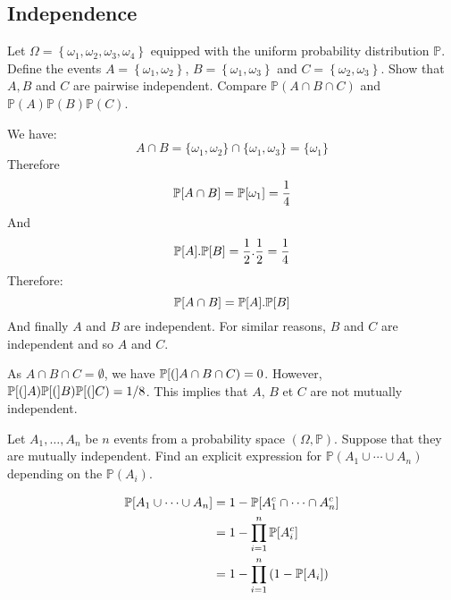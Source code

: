 \begin{center}
  \section*{Independence}
\end{center}

\begin{Exercise}[origin=Independent events]
  Let $\Omega=\left\{\omega_{1}, \omega_{2}, \omega_{3}, \omega_{4}\right\}$ equipped with the uniform probability distribution $\mathbb{P}$. Define the events $A=\left\{\omega_{1}, \omega_{2}\right\}$, $B=\left\{\omega_{1}, \omega_{3}\right\}$ and $C=\left\{\omega_{2}, \omega_{3}\right\}$.
  Show that $A, B$ and $C$ are pairwise independent. Compare $\mathbb{P}(A \cap B \cap C)$ and $\mathbb{P}(A) \mathbb{P}(B) \mathbb{P}(C)$.
\end{Exercise}

\vspace{0.5cm}

\begin{solution}
  We have:
  \[
    A \cap B = \{\omega_1, \omega_2\} \cap \{\omega_1, \omega_3\} =  \{\omega_1\}
  \]
  Therefore
  \[
    \mathbb{P}[A \cap B] = \mathbb{P}[\omega_1] = \frac{1}{4}
  \]
  And
  \[
    \mathbb{P}[A]. \mathbb{P}[B] = \frac{1}{2} . \frac{1}{2} = \frac{1}{4}
  \]
  Therefore:
  \[
    \mathbb{P}[A \cap B] = \mathbb{P}[A].\mathbb{P}[B]
  \]
  And finally $A$ and $B$ are independent. For similar reasons, $B$ and $C$ are independent and so $A$ and $C$.

  As $A \cap B \cap C=\emptyset$, we have  $\mathbb{P}[(]A \cap B \cap C) =0$. However, $\mathbb{P}[(]A) \mathbb{P}[(]B) \mathbb{P}[(]C)=1/8$. This implies that $A$, $B$ et $C$ are not mutually independent.
\end{solution}

\begin{Exercise}
  Let $A_1, \ldots , A_n$ be $n$ events from a probability space $(\Omega, \mathbb{P})$.
  Suppose that they are mutually independent. Find an explicit expression for $\mathbb{P}(A_1 \cup \cdots \cup A_n)$ depending on the $\mathbb{P}(A_i)$.
\end{Exercise}

\begin{solution}
  \begin{align*}
    \mathbb{P}[A_1 \cup \cdots \cup A_n] & = 1- \mathbb{P}[A_1^c \cap \cdots \cap A_n^c]             \\
                                     & = 1- \prod_{i = 1}^{n} \mathbb{P}[A_i^c]                  \\
                                     & = 1- \prod_{i = 1}^{n} \left( 1 - \mathbb{P}[A_i] \right)
  \end{align*}
\end{solution}

